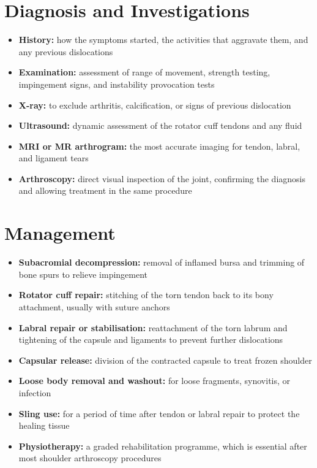 \section*{Diagnosis and Investigations}
\begin{itemize}
    \item \textbf{History:} how the symptoms started, the activities that aggravate them, and any previous dislocations
    \item \textbf{Examination:} assessment of range of movement, strength testing, impingement signs, and instability provocation tests
    \item \textbf{X-ray:} to exclude arthritis, calcification, or signs of previous dislocation
    \item \textbf{Ultrasound:} dynamic assessment of the rotator cuff tendons and any fluid
    \item \textbf{MRI or MR arthrogram:} the most accurate imaging for tendon, labral, and ligament tears
    \item \textbf{Arthroscopy:} direct visual inspection of the joint, confirming the diagnosis and allowing treatment in the same procedure
\end{itemize}

\section*{Management}
\begin{itemize}
    \item \textbf{Subacromial decompression:} removal of inflamed bursa and trimming of bone spurs to relieve impingement
    \item \textbf{Rotator cuff repair:} stitching of the torn tendon back to its bony attachment, usually with suture anchors
    \item \textbf{Labral repair or stabilisation:} reattachment of the torn labrum and tightening of the capsule and ligaments to prevent further dislocations
    \item \textbf{Capsular release:} division of the contracted capsule to treat frozen shoulder
    \item \textbf{Loose body removal and washout:} for loose fragments, synovitis, or infection
    \item \textbf{Sling use:} for a period of time after tendon or labral repair to protect the healing tissue
    \item \textbf{Physiotherapy:} a graded rehabilitation programme, which is essential after most shoulder arthroscopy procedures
\end{itemize}


